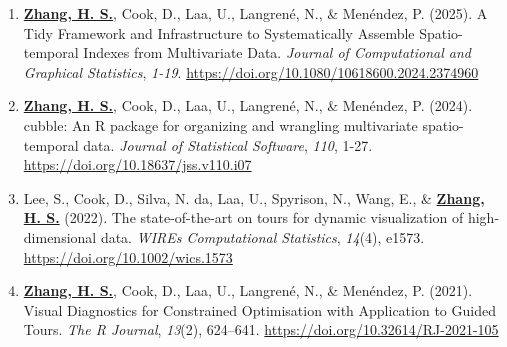 \documentclass[10pt,a4paper]{article} %
\begin{document}


\vspace{-1em}
\begin{enumerate}[itemsep=0.1em]

    \item \underline{\textbf{Zhang, H. S.}}, Cook, D., Laa, U., Langren\'e, N., \& Men\'endez, P. (2025). 
    A Tidy Framework and Infrastructure to Systematically Assemble Spatio-temporal Indexes 
    from Multivariate Data. \emph{Journal of Computational and Graphical Statistics}, 
    \emph{1-19}. \url{https://doi.org/10.1080/10618600.2024.2374960}

    \item \underline{\textbf{Zhang, H. S.}}, Cook, D., Laa, U., Langren\'e, N., \& Men\'endez, P. (2024). 
    cubble: An R package for organizing and wrangling multivariate spatio-temporal data. 
    \emph{Journal of Statistical Software}, \emph{110}, 1-27. \url{https://doi.org/10.18637/jss.v110.i07}
    
    \item Lee, S., Cook, D., Silva, N. da, Laa, U., Spyrison, N., Wang, E., \& 
    \underline{\textbf{Zhang, H. S.}} (2022). The state-of-the-art on tours for 
    dynamic visualization of high-dimensional data. \emph{WIREs Computational Statistics}, 
    \emph{14}(4), e1573. \url{https://doi.org/10.1002/wics.1573}
    
    \item \underline{\textbf{Zhang, H. S.}}, Cook, D., Laa, U., Langren\'e, N., \& Men\'endez, P. (2021). 
    Visual Diagnostics for Constrained Optimisation with Application to Guided Tours. 
    \emph{The R Journal}, \emph{13}(2), 624--641. \url{https://doi.org/10.32614/RJ-2021-105}
    

\end{enumerate}
\end{document}
